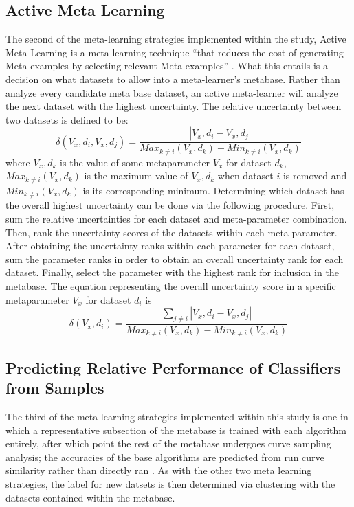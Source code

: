 \subsection{Active Meta Learning}
The second of the meta-learning strategies implemented within the study, Active
Meta Learning is a meta learning technique  ``that reduces the cost of
generating Meta examples by selecting relevant Meta examples'' \cite{Bhatt}.
What this entails is a decision on what datasets to allow into a meta-learner's
metabase. Rather than analyze every candidate meta base dataset, an active
meta-learner will analyze the next dataset with the highest uncertainty. The
relative uncertainty between two datasets is defined to be:
$$\delta(V_x,d_i,V_x,d_j) = \frac{|V_x,d_i - V_x,d_j|}{Max_{k\neq i}(V_x,d_k)- Min_{k\neq i}(V_x,d_k)}$$
where $V_x,d_k$ is the value of some metaparameter $V_x$ for dataset $d_k$,
$Max_{k\neq i}(V_x,d_k)$ is the maximum value of $V_x,d_k$ when dataset $i$ is
removed and $Min_{k\neq i}(V_x,d_k)$ is its corresponding minimum. Determining
which dataset has the overall highest uncertainty can be done via the following
procedure. First, sum the relative uncertainties for each dataset and
meta-parameter combination. Then, rank the uncertainty scores of the datasets within
each meta-parameter. After obtaining the uncertainty ranks within each parameter
for each dataset, sum the parameter ranks in order to obtain an overall
uncertainty rank for each dataset. Finally, select the parameter with the
highest rank for inclusion in the metabase. The equation representing the
overall uncertainty score in a specific metaparameter $V_x$ for dataset $d_i$ is
$$\delta(V_x,d_i) = \frac{\sum_{j\neq i} |V_x,d_i - V_x,d_j|}{Max_{k\neq i}(V_x,d_k)- Min_{k\neq i}(V_x,d_k)}$$
\subsection{Predicting Relative Performance of Classifiers from Samples}
The third of the meta-learning strategies implemented within this study is one in
which a representative subsection of the metabase is trained with each algorithm
entirely, after which point the rest of the metabase undergoes curve
sampling analysis; the accuracies of the base algorithms are predicted from
run curve similarity rather than directly ran \cite{Leite}.
As with the other two meta learning strategies, the label for new datsets is
then determined via clustering with the datasets contained within the metabase.

